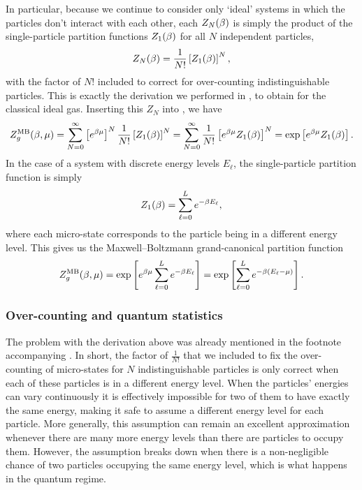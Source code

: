 In particular, because we continue to consider only `ideal' systems in which the particles don't interact with each other, each $Z_N(\beta)$ is simply the product of the single-particle partition functions $Z_1(\beta)$ for all $N$ independent particles,
\begin{equation*}
  Z_N(\beta) = \frac{1}{N!} \left[Z_1(\beta)\right]^N,
\end{equation*}
with the factor of $N!$ included to correct for over-counting indistinguishable particles.
This is exactly the derivation we performed in , to obtain  for the classical ideal gas.
Inserting this $Z_N$ into , we have
\begin{equation*}
  Z_g^{\text{MB}}(\beta, \mu) = \sum_{N = 0}^{\infty} \left[e^{\beta\mu}\right]^N \frac{1}{N!} \left[Z_1(\beta)\right]^N = \sum_{N = 0}^{\infty} \frac{1}{N!} \left[e^{\beta\mu} Z_1(\beta)\right]^N = \exp\left[e^{\beta\mu} Z_1(\beta)\right].
\end{equation*}
In the case of a system with discrete energy levels $E_{\ell}$, the single-particle partition function is simply
\begin{equation*}
  Z_1(\beta) = \sum_{\ell = 0}^L e^{-\beta E_{\ell}},
\end{equation*}
where each micro-state corresponds to the particle being in a different energy level.
This gives us the Maxwell--Boltzmann grand-canonical partition function
\begin{equation}
  \label{eq:partfunc_MB_nonfactor}
  Z_g^{\text{MB}}(\beta, \mu) = \exp\left[e^{\beta\mu} \sum_{\ell = 0}^L e^{-\beta E_{\ell}} \right] = \exp\left[\sum_{\ell = 0}^L e^{-\beta\left(E_{\ell} - \mu\right)}\right].
\end{equation}



\subsubsection{Over-counting and quantum statistics}
The problem with the derivation above was already mentioned in the footnote accompanying .
In short, the factor of $\frac{1}{N!}$ that we included to fix the over-counting of micro-states for $N$ indistinguishable particles is only correct when each of these particles is in a different energy level.
When the particles' energies can vary continuously it is effectively impossible for two of them to have exactly the same energy, making it safe to assume a different energy level for each particle.
More generally, this assumption can remain an excellent approximation whenever there are many more energy levels than there are particles to occupy them.
However, the assumption breaks down when there is a non-negligible chance of two particles occupying the same energy level, which is what happens in the quantum regime.

